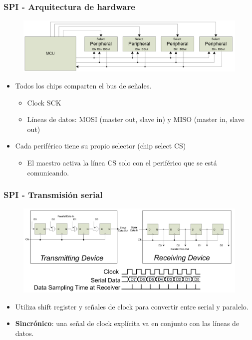 \documentclass[10.5pt,scale=1.0,t,aspectratio=169,hyperref={pdfpagelabels=false}]{beamer}
\begin{document}
\frame{
	\begin{center}
		\vspace{3cm}
		\LARGE \textcolor{blue}{COMUNICACIONES SPI \\ (Serial Peripheral Interface)}
	\end{center}
}
\begin{frame}
	\frametitle{SPI - Arquitectura de hardware}
	
	\begin{figure}
		\centering
		\includegraphics[scale=0.35]{10_SPIArchitecture}
	\end{figure}
	
	\begin{itemize}
		\item Todos los chips comparten el bus de señales.
		\begin{itemize}
			\item Clock SCK
			\item Líneas de datos: MOSI (master out, slave in) y MISO (master in, slave out)
		\end{itemize}
		\item Cada periférico tiene su propio selector (chip select CS)
		\begin{itemize}
			\item El maestro activa la línea CS solo con el periférico que se está comunicando. 
		\end{itemize}
	\end{itemize}
\end{frame}
\begin{frame}
	\frametitle{SPI - Transmisión serial}
	
	\begin{figure}
		\centering
		\includegraphics[scale=0.35]{11_SPISerial}
	\end{figure}
	
	\begin{itemize}
		\item Utiliza shift register y señales de clock para convertir entre serial y paralelo.
		\item \textbf{Sincrónico}: una señal de clock explícita va en conjunto con las líneas de datos. 
	\end{itemize}
\end{frame}
\end{document}

